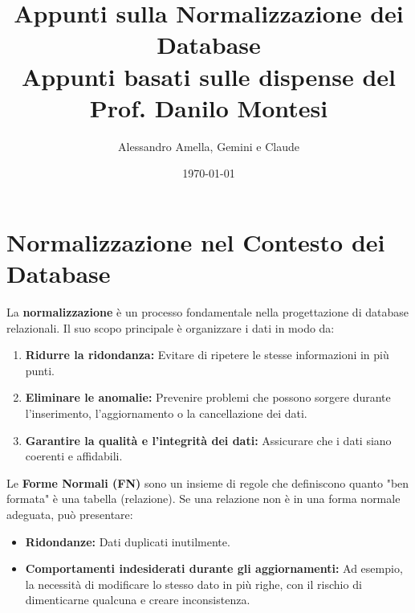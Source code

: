 

\usepackage{hyperref}

\title{Appunti sulla Normalizzazione dei Database\\
  \large Appunti basati sulle dispense del Prof. Danilo Montesi}
\author{Alessandro Amella, Gemini e Claude}
\date{\today}


	
	\maketitle
	\tableofcontents
	\newpage
	
	\section{Normalizzazione nel Contesto dei Database}
	
	La \textbf{normalizzazione} è un processo fondamentale nella progettazione di database relazionali. Il suo scopo principale è organizzare i dati in modo da:
	\begin{enumerate}
		\item \textbf{Ridurre la ridondanza:} Evitare di ripetere le stesse informazioni in più punti.
		\item \textbf{Eliminare le anomalie:} Prevenire problemi che possono sorgere durante l'inserimento, l'aggiornamento o la cancellazione dei dati.
		\item \textbf{Garantire la qualità e l'integrità dei dati:} Assicurare che i dati siano coerenti e affidabili.
	\end{enumerate}
	
	Le \textbf{Forme Normali (FN)} sono un insieme di regole che definiscono quanto "ben formata" è una tabella (relazione). Se una relazione non è in una forma normale adeguata, può presentare:
	\begin{itemize}
		\item \textbf{Ridondanze:} Dati duplicati inutilmente.
		\item \textbf{Comportamenti indesiderati durante gli aggiornamenti:} Ad esempio, la necessità di modificare lo stesso dato in più righe, con il rischio di dimenticarne qualcuna e creare inconsistenza.
	\end{itemize}
	
